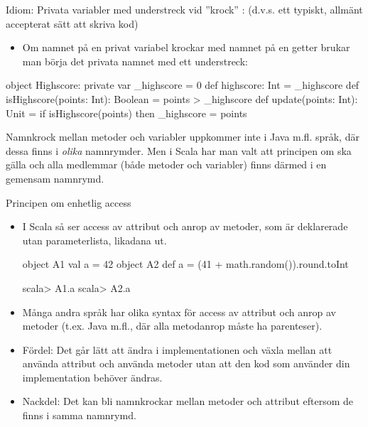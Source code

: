 \begin{Slide}{Idiom: Privata variabler med understreck vid ''krock''}\SlideFontSmall
{}: (d.v.s. ett typiskt, allmänt accepterat sätt att skriva kod)
\begin{itemize}
  \item Om namnet på en privat variabel krockar med namnet på en getter
  brukar man börja det privata namnet med ett understreck:
\end{itemize}

\begin{CodeSmall}
object Highscore:
  private var _highscore = 0
  def highscore: Int = _highscore
  def isHighscore(points: Int): Boolean = points > _highscore
  def update(points: Int): Unit = if isHighscore(points) then _highscore = points
\end{CodeSmall}

\pause

{\SlideFontTiny Namnkrock mellan metoder och variabler uppkommer inte i Java m.fl. språk, där dessa finns i \emph{olika} namnrymder.
Men i Scala har man valt att principen om  ska gälla och alla medlemmar (både metoder och variabler) finns därmed i en gemensam namnrymd.}

\end{Slide}

\begin{Slide}{Principen om enhetlig access}\SlideFontSmall
  \begin{itemize}
    \item I Scala så ser access av attribut och anrop av metoder, som är deklarerade utan parameterlista, likadana ut. 
\begin{Code}
object A1 { val a = 42 }  
object A2 { def a = (41 + math.random()).round.toInt }
\end{Code}
\begin{REPLnonum}
scala> A1.a
scala> A2.a  
\end{REPLnonum}
    \item Många andra språk har olika syntax för access av attribut och anrop av metoder (t.ex. Java m.fl., där alla metodanrop måste ha parenteser).
    \item Fördel: Det går lätt att ändra i implementationen och växla mellan att använda attribut och använda metoder utan att den kod som använder din implementation behöver ändras.
    \item Nackdel: Det kan bli namnkrockar mellan metoder och attribut eftersom de finns i samma namnrymd.
  \end{itemize}
  
\end{Slide}



